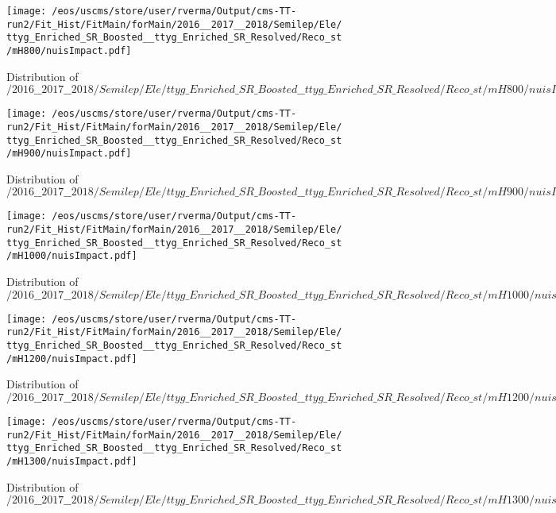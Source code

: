 \begin{figure}
\centering
\texttt{[image: /eos/uscms/store/user/rverma/Output/cms-TT-run2/Fit\_Hist/FitMain/forMain/2016\_\_2017\_\_2018/Semilep/Ele/ttyg\_Enriched\_SR\_Boosted\_\_ttyg\_Enriched\_SR\_Resolved/Reco\_st/mH800/nuisImpact.pdf]}
\caption{Distribution of $/2016\_\_2017\_\_2018/Semilep/Ele/ttyg\_Enriched\_SR\_Boosted\_\_ttyg\_Enriched\_SR\_Resolved/Reco\_st/mH800/nuisImpact.pdf$}
\end{figure}

\begin{figure}
\centering
\texttt{[image: /eos/uscms/store/user/rverma/Output/cms-TT-run2/Fit\_Hist/FitMain/forMain/2016\_\_2017\_\_2018/Semilep/Ele/ttyg\_Enriched\_SR\_Boosted\_\_ttyg\_Enriched\_SR\_Resolved/Reco\_st/mH900/nuisImpact.pdf]}
\caption{Distribution of $/2016\_\_2017\_\_2018/Semilep/Ele/ttyg\_Enriched\_SR\_Boosted\_\_ttyg\_Enriched\_SR\_Resolved/Reco\_st/mH900/nuisImpact.pdf$}
\end{figure}

\begin{figure}
\centering
\texttt{[image: /eos/uscms/store/user/rverma/Output/cms-TT-run2/Fit\_Hist/FitMain/forMain/2016\_\_2017\_\_2018/Semilep/Ele/ttyg\_Enriched\_SR\_Boosted\_\_ttyg\_Enriched\_SR\_Resolved/Reco\_st/mH1000/nuisImpact.pdf]}
\caption{Distribution of $/2016\_\_2017\_\_2018/Semilep/Ele/ttyg\_Enriched\_SR\_Boosted\_\_ttyg\_Enriched\_SR\_Resolved/Reco\_st/mH1000/nuisImpact.pdf$}
\end{figure}

\begin{figure}
\centering
\texttt{[image: /eos/uscms/store/user/rverma/Output/cms-TT-run2/Fit\_Hist/FitMain/forMain/2016\_\_2017\_\_2018/Semilep/Ele/ttyg\_Enriched\_SR\_Boosted\_\_ttyg\_Enriched\_SR\_Resolved/Reco\_st/mH1200/nuisImpact.pdf]}
\caption{Distribution of $/2016\_\_2017\_\_2018/Semilep/Ele/ttyg\_Enriched\_SR\_Boosted\_\_ttyg\_Enriched\_SR\_Resolved/Reco\_st/mH1200/nuisImpact.pdf$}
\end{figure}

\begin{figure}
\centering
\texttt{[image: /eos/uscms/store/user/rverma/Output/cms-TT-run2/Fit\_Hist/FitMain/forMain/2016\_\_2017\_\_2018/Semilep/Ele/ttyg\_Enriched\_SR\_Boosted\_\_ttyg\_Enriched\_SR\_Resolved/Reco\_st/mH1300/nuisImpact.pdf]}
\caption{Distribution of $/2016\_\_2017\_\_2018/Semilep/Ele/ttyg\_Enriched\_SR\_Boosted\_\_ttyg\_Enriched\_SR\_Resolved/Reco\_st/mH1300/nuisImpact.pdf$}
\end{figure}

